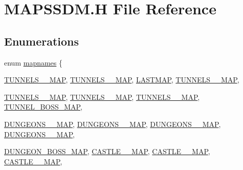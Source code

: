 \hypertarget{MAPSSDM_8H}{
\section{MAPSSDM.H File Reference}
\label{MAPSSDM_8H}
}
\subsection*{Enumerations}
\begin{DoxyCompactItemize}
\item 
enum \hyperlink{MAPSSDM_8H_a1949852ef0462081a2b248dd4918bb86}{mapnames} \{ \par
\hyperlink{MAPSSDM_8H_a1949852ef0462081a2b248dd4918bb86acbdf704da923641aa047528fadd773fa}{TUNNELS\_\_\-MAP}, 
\hyperlink{MAPSSDM_8H_a1949852ef0462081a2b248dd4918bb86a0714d98acd387ceab72b37c2ce15337b}{TUNNELS\_\_\-MAP}, 
\hyperlink{MAPSSDM_8H_a1949852ef0462081a2b248dd4918bb86ad3af5aeeef56724be68af11d0a6680b3}{LASTMAP}, 
\hyperlink{MAPSSOD_8H_a1949852ef0462081a2b248dd4918bb86acbdf704da923641aa047528fadd773fa}{TUNNELS\_\_\-MAP}, 
\par
\hyperlink{MAPSSOD_8H_a1949852ef0462081a2b248dd4918bb86a0714d98acd387ceab72b37c2ce15337b}{TUNNELS\_\_\-MAP}, 
\hyperlink{MAPSSOD_8H_a1949852ef0462081a2b248dd4918bb86a0d874dc7ecc82a838419319fdf1e8981}{TUNNELS\_\_\-MAP}, 
\hyperlink{MAPSSOD_8H_a1949852ef0462081a2b248dd4918bb86acaaf614245869150fddf14e70c58e814}{TUNNELS\_\_\-MAP}, 
\hyperlink{MAPSSOD_8H_a1949852ef0462081a2b248dd4918bb86a00ffe67ecf2d79d6e249734e3c10f835}{TUNNEL\_\-BOSS\_\-MAP}, 
\par
\hyperlink{MAPSSOD_8H_a1949852ef0462081a2b248dd4918bb86a2a41440fb231f456ba48a61b3750a433}{DUNGEONS\_\_\-MAP}, 
\hyperlink{MAPSSOD_8H_a1949852ef0462081a2b248dd4918bb86a71604e9c0be7e84b7a077e1014d16551}{DUNGEONS\_\_\-MAP}, 
\hyperlink{MAPSSOD_8H_a1949852ef0462081a2b248dd4918bb86ac36508495618f8433a43efca3cb5db5d}{DUNGEONS\_\_\-MAP}, 
\hyperlink{MAPSSOD_8H_a1949852ef0462081a2b248dd4918bb86a708337f0295e8e4da5d955451956a603}{DUNGEONS\_\_\-MAP}, 
\par
\hyperlink{MAPSSOD_8H_a1949852ef0462081a2b248dd4918bb86a1b3c9e6cc77c7f84b6ae038051781e3d}{DUNGEON\_\-BOSS\_\-MAP}, 
\hyperlink{MAPSSOD_8H_a1949852ef0462081a2b248dd4918bb86a4c9c00b088ae5f84423f30ea9fa44f33}{CASTLE\_\_\-MAP}, 
\hyperlink{MAPSSOD_8H_a1949852ef0462081a2b248dd4918bb86acb20a9eff2b66ec774cd4516ad2c6d13}{CASTLE\_\_\-MAP}, 
\hyperlink{MAPSSOD_8H_a1949852ef0462081a2b248dd4918bb86a06b22b4044c73d114ec301f7e57fb22c}{CASTLE\_\_\-MAP}, 

\end{DoxyCompactItemize}
